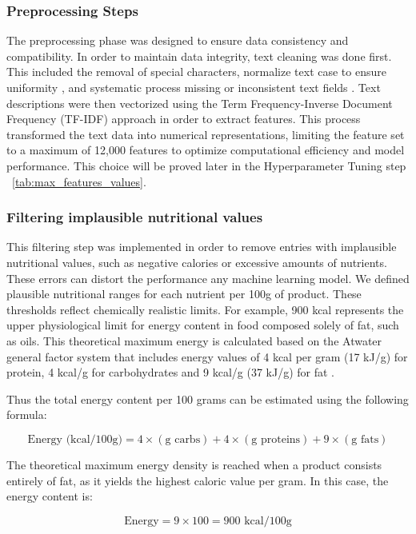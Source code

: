 \subsubsection{Preprocessing Steps}
The preprocessing phase was designed to ensure data consistency and compatibility. In order to maintain data integrity, text cleaning was done first. This included the removal of special characters, normalize text case to ensure uniformity , and systematic process missing or inconsistent text fields . Text descriptions were then vectorized using the Term Frequency-Inverse Document Frequency (TF-IDF) approach in order to extract features. This process transformed the text data into numerical representations, limiting the feature set to a maximum of 12,000 features  to optimize computational efficiency and model performance. This choice will be proved later in the Hyperparameter Tuning step ~\ref{tab:max_features_values}.

\subsubsection{Filtering implausible nutritional values}

This filtering step was implemented in order to remove entries with implausible nutritional values, such as negative calories or excessive amounts of nutrients. These errors can distort  the performance any machine learning model. We defined plausible nutritional ranges for each nutrient per 100g of product. These thresholds reflect chemically realistic limits. 
For example,  900 kcal represents the upper physiological limit for energy content in food composed solely of fat, such as oils. This theoretical maximum energy is calculated based on the Atwater general factor system that includes energy values of 4 kcal per gram (17 kJ/g) for protein, 4 kcal/g for carbohydrates and 9 kcal/g (37 kJ/g) for fat \cite{huel_energy_calculation}.

Thus the total energy content per 100 grams can be estimated using the following formula:

$$
\text{Energy (kcal/100g)} = 4 \times (\text{g carbs}) + 4 \times (\text{g proteins}) + 9 \times (\text{g fats})
$$

The theoretical maximum energy density is reached when a product consists entirely of fat, as it yields the highest caloric value per gram. In this case, the energy content is:

\[
\text{Energy} = 9 \times 100 = 900 \text{ kcal/100g}
\]


